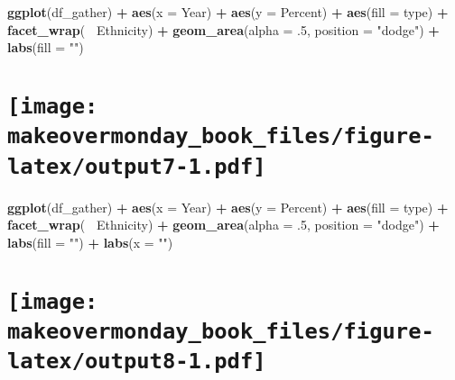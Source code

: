 \documentclass[]{book}
\newenvironment{Shaded}{\begin{snugshade}}{\end{snugshade}}
\newcommand{\KeywordTok}[1]{\textcolor[rgb]{0.13,0.29,0.53}{\textbf{#1}}}
\newcommand{\DataTypeTok}[1]{\textcolor[rgb]{0.13,0.29,0.53}{#1}}
\newcommand{\DecValTok}[1]{\textcolor[rgb]{0.00,0.00,0.81}{#1}}
\newcommand{\StringTok}[1]{\textcolor[rgb]{0.31,0.60,0.02}{#1}}
\newcommand{\OperatorTok}[1]{\textcolor[rgb]{0.81,0.36,0.00}{\textbf{#1}}}
\newcommand{\NormalTok}[1]{#1}
\theoremstyle{definition}
\theoremstyle{definition}
\theoremstyle{definition}
\theoremstyle{remark}
\begin{document}
\clearpage

\begin{Shaded}
\begin{Highlighting}[]
\KeywordTok{ggplot}\NormalTok{(df_gather) }\OperatorTok{+}
\StringTok{  }\KeywordTok{aes}\NormalTok{(}\DataTypeTok{x =}\NormalTok{ Year) }\OperatorTok{+}
\StringTok{  }\KeywordTok{aes}\NormalTok{(}\DataTypeTok{y =}\NormalTok{ Percent) }\OperatorTok{+}
\StringTok{  }\KeywordTok{aes}\NormalTok{(}\DataTypeTok{fill =}\NormalTok{ type) }\OperatorTok{+}
\StringTok{  }\KeywordTok{facet_wrap}\NormalTok{(}\OperatorTok{~}\StringTok{ }\NormalTok{Ethnicity) }\OperatorTok{+}
\StringTok{  }\KeywordTok{geom_area}\NormalTok{(}\DataTypeTok{alpha =}\NormalTok{ .}\DecValTok{5}\NormalTok{, }\DataTypeTok{position =} \StringTok{"dodge"}\NormalTok{) }\OperatorTok{+}
\StringTok{  }\KeywordTok{labs}\NormalTok{(}\DataTypeTok{fill =} \StringTok{""}\NormalTok{) }
\end{Highlighting}
\end{Shaded}

\section[]{\texorpdfstring{\protect\texttt{[image: makeovermonday\_book\_files/figure-latex/output7-1.pdf]}}{}}\label{section-6}

\clearpage

\begin{Shaded}
\begin{Highlighting}[]
\KeywordTok{ggplot}\NormalTok{(df_gather) }\OperatorTok{+}
\StringTok{  }\KeywordTok{aes}\NormalTok{(}\DataTypeTok{x =}\NormalTok{ Year) }\OperatorTok{+}
\StringTok{  }\KeywordTok{aes}\NormalTok{(}\DataTypeTok{y =}\NormalTok{ Percent) }\OperatorTok{+}
\StringTok{  }\KeywordTok{aes}\NormalTok{(}\DataTypeTok{fill =}\NormalTok{ type) }\OperatorTok{+}
\StringTok{  }\KeywordTok{facet_wrap}\NormalTok{(}\OperatorTok{~}\StringTok{ }\NormalTok{Ethnicity) }\OperatorTok{+}
\StringTok{  }\KeywordTok{geom_area}\NormalTok{(}\DataTypeTok{alpha =}\NormalTok{ .}\DecValTok{5}\NormalTok{, }\DataTypeTok{position =} \StringTok{"dodge"}\NormalTok{) }\OperatorTok{+}
\StringTok{  }\KeywordTok{labs}\NormalTok{(}\DataTypeTok{fill =} \StringTok{""}\NormalTok{) }\OperatorTok{+}
\StringTok{  }\KeywordTok{labs}\NormalTok{(}\DataTypeTok{x =} \StringTok{""}\NormalTok{) }
\end{Highlighting}
\end{Shaded}

\section[]{\texorpdfstring{\protect\texttt{[image: makeovermonday\_book\_files/figure-latex/output8-1.pdf]}}{}}\label{section-7}
\end{document}
